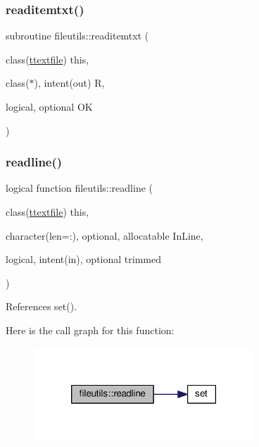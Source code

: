 \mbox{\label{namespacefileutils_a66242f0b2d2b3f96d182f76f5e616c7d}} 
\subsubsection{\texorpdfstring{readitemtxt()}{readitemtxt()}}
{\footnotesize\ttfamily subroutine fileutils\+::readitemtxt (\begin{DoxyParamCaption}\item[{class(\mbox{\hyperlink{structfileutils_1_1ttextfile}{ttextfile}})}]{this,  }\item[{class($\ast$), intent(out)}]{R,  }\item[{logical, optional}]{OK }\end{DoxyParamCaption})\hspace{0.3cm}{\ttfamily [private]}}

\mbox{\label{namespacefileutils_affa8ee4edc46a1fcbc9da79877e80724}} 
\subsubsection{\texorpdfstring{readline()}{readline()}}
{\footnotesize\ttfamily logical function fileutils\+::readline (\begin{DoxyParamCaption}\item[{class(\mbox{\hyperlink{structfileutils_1_1ttextfile}{ttextfile}})}]{this,  }\item[{character(len=\+:), optional, allocatable}]{In\+Line,  }\item[{logical, intent(in), optional}]{trimmed }\end{DoxyParamCaption})\hspace{0.3cm}{\ttfamily [private]}}



References set().

Here is the call graph for this function\+:
\nopagebreak
\begin{figure}[H]
\begin{center}
\leavevmode
\includegraphics[width=234pt]{namespacefileutils_affa8ee4edc46a1fcbc9da79877e80724_cgraph}
\end{center}
\end{figure}
\mbox{\label{namespacefileutils_a8adc28c1f4192183517beb41ccec4287}} 
